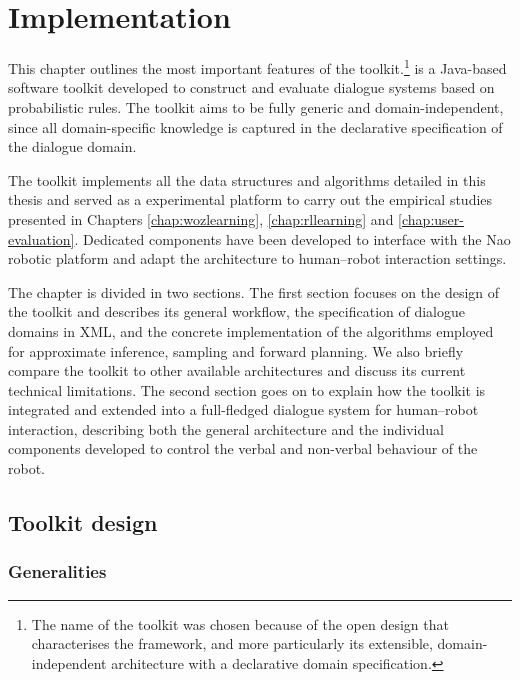 \chapter{Implementation}
\label{chap:opendial}

This chapter outlines the most important features of the \opendial{} toolkit.\footnote{The name of the toolkit was chosen because of the open design that characterises the framework, and more particularly its extensible, domain-independent architecture with a declarative domain specification.} \opendial{} is a Java-based software toolkit developed to construct and evaluate dialogue systems based on probabilistic rules. The toolkit aims to be fully generic and domain-independent, since all domain-specific knowledge is captured in the declarative specification of the dialogue domain.

The toolkit implements all the data structures and algorithms detailed in this thesis and served as a experimental platform to carry out the empirical studies presented in Chapters \ref{chap:wozlearning}, \ref{chap:rllearning} and \ref{chap:user-evaluation}. Dedicated components have been developed to interface \opendial{} with the Nao robotic platform and adapt the architecture to human--robot interaction settings.

The chapter is divided in two sections.  The first section focuses on the design of the \opendial{} toolkit and describes its general workflow, the specification of dialogue domains in XML, and the concrete implementation of the algorithms employed for approximate inference, sampling and forward planning. We also briefly compare the toolkit to other available architectures and discuss its current technical limitations.  The second section goes on to explain how the toolkit is integrated and extended into a full-fledged dialogue system for human--robot interaction, describing both the general architecture and the individual components developed to control the verbal and non-verbal behaviour of the robot.  

\section{Toolkit design}
\label{sec:genarchitecture}

\subsection{Generalities}

